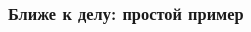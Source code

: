 \documentclass{beamer}
\begin{document}
\begin{frame}
  \frametitle{Ближе к делу: простой пример}
  \begin{columns}
    \begin{column}{0.5\textwidth}
      \begin{figure}[h!]
      \end{figure}
    \end{column}
    \begin{column}{0.5\textwidth}
      \begin{figure}[h!]
      \end{figure}
    \end{column}
  \end{columns}
\end{frame}
\end{document}
